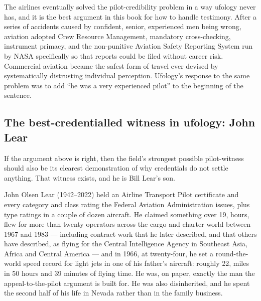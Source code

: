 \begin{funfact}
The airlines eventually solved the pilot-credibility problem in a way ufology never has, and it
is the best argument in this book for how to handle testimony. After a series of accidents caused
by confident, senior, experienced men being wrong, aviation adopted Crew Resource Management,
mandatory cross-checking, instrument primacy, and the non-punitive Aviation Safety Reporting
System run by NASA specifically so that reports could be filed without career risk. Commercial
aviation became the safest form of travel ever devised by systematically distrusting individual
perception. Ufology's response to the same problem was to add ``he was a very experienced pilot''
to the beginning of the sentence.
\end{funfact}

\subsection{The best-credentialled witness in ufology: John Lear}\label{sec:johnlear}

If the argument above is right, then the field's strongest possible pilot-witness should also be
its clearest demonstration of why credentials do not settle anything. That witness exists, and he
is Bill Lear's son.

John Olsen Lear (1942--2022) held an Airline Transport Pilot certificate and every category and
class rating the Federal Aviation Administration issues, plus type ratings in a couple of dozen
aircraft. He claimed something over 19, hours, flew for more than twenty operators across the
cargo and charter world between 1967 and 1983 --- including contract work that he later described,
and that others have described, as flying for the Central Intelligence Agency in Southeast Asia,
Africa and Central America --- and in 1966, at twenty-four, he set a round-the-world speed record
for light jets in one of his father's aircraft: roughly 22, miles in 50 hours and 39 minutes
of flying time. He was, on paper, exactly the man the appeal-to-the-pilot argument is built for.
He was also disinherited, and he spent the second half of his life in Nevada rather than in the
family business.


